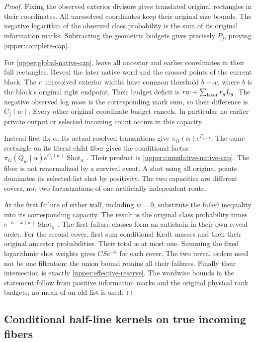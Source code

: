 \begin{proof}
Fixing the observed exterior divisors gives translated original
rectangles in their coordinates.  All unresolved coordinates keep
their original size bounds.  The negative logarithm of the observed
class probability is the sum of its original information marks.
Subtracting the geometric budgets gives precisely $P_j$, proving
\eqref{upper:complete-cap}.

For \eqref{upper:global-native-cap}, leave all ancestor and earlier
coordinates in their full rectangles.  Reveal the later native word
and the crossed points of the current block.  The $r$ unresolved
exterior widths have common threshold $b-w$, where $b$ is the block's
original right endpoint.  Their budget deficit is
$rw+\sum_{\rm later}r_gL_g$.  The negative observed log mass is the
corresponding mark sum, so their difference is $C_j(w)$.  Every other
original coordinate budget cancels.  In particular no earlier private
output or selected incoming count occurs in this capacity.

Instead first fix $\alpha$.  Its actual resolved translations give
$\pi_G(\alpha)e^{P_{j-1}}$.  The same rectangle on its literal child
fiber gives the conditional factor
$\pi_G(Q_w\mid\alpha)e^{C_j(w)}\operatorname{Shot}_w$.
Their product is \eqref{upper:cumulative-native-cap}.  The fiber is
not renormalized by a survival event.  A shot using all original
points dominates its selected-list shot by positivity.  The two
capacities are different covers, not two factorizations of one
artificially independent route.

At the first failure of either wall, including $w=0$, substitute
the failed inequality into its corresponding capacity.  The result
is the original class probability times
$e^{-h-\mathcal L(w)}\operatorname{Shot}_w$.  The first-failure
classes form an antichain in their own reveal order.  For the second
cover, first sum conditional Kraft masses and then their original
ancestor probabilities.  Their total is at most one.  Summing the
fixed logarithmic shot weights gives $CS e^{-h}$ for each cover.
The two reveal orders need not be one filtration: the union bound
retains all their failures.  Finally their intersection is exactly
\eqref{upper:effective-reserve}.  The wordwise bounds in the statement
follow from positive information marks and the original physical
rank budgets; no mean of an old list is used.
\end{proof}

\subsection{Conditional half-line kernels on true incoming fibers}
\label{upper:kernels-section}

